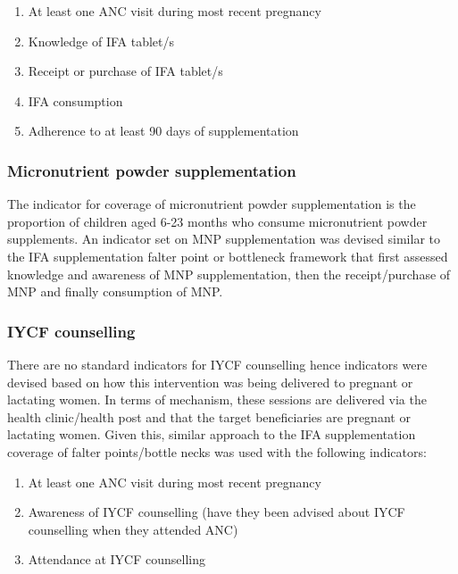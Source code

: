 \documentclass[12pt,a4paper]{article}
\begin{document}
\begin{enumerate}
\def\labelenumi{\arabic{enumi}.}
\item
  At least one ANC visit during most recent pregnancy
\item
  Knowledge of IFA tablet/s
\item
  Receipt or purchase of IFA tablet/s
\item
  IFA consumption
\item
  Adherence to at least 90 days of supplementation
\end{enumerate}

\hypertarget{micronutrient-powder-supplementation}{%
\subsubsection{Micronutrient powder supplementation}\label{micronutrient-powder-supplementation}}

The indicator for coverage of micronutrient powder supplementation is the proportion of children aged 6-23 months who consume micronutrient powder supplements. An indicator set on MNP supplementation was devised similar to the IFA supplementation falter point or bottleneck framework that first assessed knowledge and awareness of MNP supplementation, then the receipt/purchase of MNP and finally consumption of MNP.

\hypertarget{iycf-counselling}{%
\subsubsection{IYCF counselling}\label{iycf-counselling}}

There are no standard indicators for IYCF counselling hence indicators were devised based on how this intervention was being delivered to pregnant or lactating women. In terms of mechanism, these sessions are delivered via the health clinic/health post and that the target beneficiaries are pregnant or lactating women. Given this, similar approach to the IFA supplementation coverage of falter points/bottle necks was used with the following indicators:

\begin{enumerate}
\def\labelenumi{\arabic{enumi}.}
\item
  At least one ANC visit during most recent pregnancy
\item
  Awareness of IYCF counselling (have they been advised about IYCF counselling when they attended ANC)
\item
  Attendance at IYCF counselling
\end{enumerate}
\end{document}
